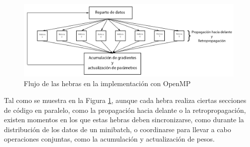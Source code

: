 \begin{figure}[H]
	\centering
	\includegraphics[width=1.2\linewidth]{imagenes/openmp_flujo.jpg} 
	\caption{Flujo de las hebras en la implementación con OpenMP}
	\label{fig:openmp_flujo}
\end{figure}

Tal como se muestra en la Figura \ref{fig:openmp_flujo}, aunque cada hebra realiza ciertas secciones de código en paralelo, como la propagación hacia delante o la retropropagación, existen momentos en los que estas hebras deben sincronizarse, como durante la distribución de los datos de un minibatch, o coordinarse para llevar a cabo operaciones conjuntas, como la acumulación y actualización de pesos.

